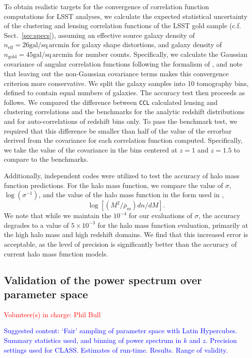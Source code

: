\documentclass[\docopts]{\docclass}
\newcommand{\vol}[1]{\textcolor{red}{Volunteer(s) in charge: #1}}
\newcommand{\cont}[1]{\textcolor{blue}{Suggested content: #1}}
\newcommand{\ccl}{{\tt CCL}\xspace}
\begin{document}
To obtain realistic targets for the convergence of correlation function computations for LSST analyses, we calculate the expected statistical uncertainty of the clustering and lensing correlation functions of the LSST gold sample (c.f. Sect.~\ref{sec:specs}), assuming an effective source galaxy density of $n_\mathrm{eff} = 26\mathrm{gal/sq\,arcmin}$ for galaxy shape distortions, and galaxy density of $n_\mathrm{gold} = 45\mathrm{gal/sq\,arcmin}$ for number counts. Specifically, we calculate the Gaussian covariance of angular correlation functions following the formalism of \citet{2008A&A...477...43J}, and note that leaving out the non-Gaussian covariance terms makes this convergence criterion more conservative. We split the galaxy samples into 10 tomography bins, defined to contain equal numbers of galaxies. The accuracy test then proceeds as follows. We compared the difference between \ccl calculated lensing and clustering correlations and the benchmarks for the analytic redshift distributions and for auto-correlations of redshift bins only. To pass the benchmark test, we required that this difference be smaller than half of the value of the errorbar derived from the covariance for each correlation function computed. Specifically, we take the value of the covariance in the bins centered at $z=1$ and $z=1.5$ to compare to the benchmarks.

Additionally, independent codes were utilized to test the accuracy of halo mass function predictions. For the halo mass function, we compare the value of $\sigma$, $\log(\sigma^{-1})$, and the value of the halo mass function in the form used in \cite{Tinker2008},
\begin{equation}
\log[(M^2/\bar{\rho}_m)dn/dM].
\end{equation}
We note that while we maintain the $10^{-4}$ for our evaluations of $\sigma$, the accuracy degrades to a value of $5\times10^{-3}$ for the halo mass function evaluation, primarily at the high halo mass and high redshift domains. We find that this increased error is acceptable, as the level of precision is significantly better than the accuracy of current halo mass function models.

\subsection{Validation of the power spectrum over parameter space}
\vol{Phil Bull}

\cont{ `Fair' sampling of parameter space with Latin Hypercubes. Summary statistics used, and binning of power spectrum in $k$ and $z$. Precision settings used for CLASS. Estimates of run-time. Results. Range of validity.}
\end{document}
